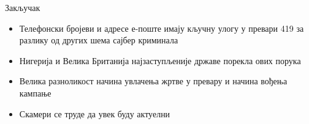 \documentclass[compress, containsverbatim,mathserif, xcolor=dvipsnames, unicode]{beamer}
\begin{document}
\begin{frame}{Закључак}
\begin{itemize}
	\item Телефонски бројеви и адресе е-поште имају кључну улогу у превари 419 за разлику од других шема сајбер криминала
	\item Нигерија и Велика Британија најзаступљеније државе порекла ових порука
	\item Велика разноликост начина увлачења жртве у превару и начина вођења кампање
	\item Скамери се труде да увек буду актуелни
\end{itemize}
\end{frame}
\end{document}
